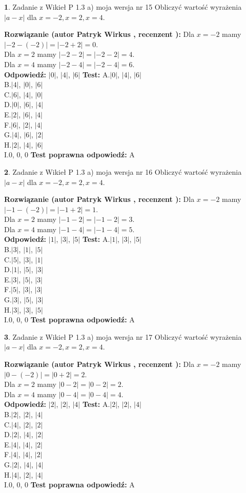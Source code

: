 \documentclass[12pt, a4paper]{article}
\theoremstyle{definition} %
\newtheorem{zad}{}
\newcommand{\zadStart}[1]{\begin{zad}#1\newline}
\newcommand{\zadStop}{\end{zad}}
\newcommand{\rozwStart}[2]{\noindent \textbf{Rozwiązanie (autor #1 , recenzent #2): }\newline}
\newcommand{\rozwStop}{\newline}
\newcommand{\odpStart}{\noindent \textbf{Odpowiedź:}\newline}
\newcommand{\odpStop}{\newline}
\newcommand{\testStart}{\noindent \textbf{Test:}\newline}
\newcommand{\testStop}{\newline}
\newcommand{\kluczStart}{\noindent \textbf{Test poprawna odpowiedź:}\newline}
\newcommand{\kluczStop}{\newline}
\begin{document}
\zadStart{Zadanie z Wikieł P 1.3 a) moja wersja nr 15}
Obliczyć wartość wyrażenia $|a - x|$ dla $x=-2,x=2,x=4$.
\zadStop
\rozwStart{Patryk Wirkus}{}
Dla $x = -2$ mamy $|-2 - (-2)| = |-2 + 2| = 0$.\\
Dla $x = 2$ mamy $|-2 - 2| = |-2 - 2| = 4$.\\
Dla $x = 4$ mamy $|-2 - 4| = |-2 - 4| = 6$.\\
\rozwStop
\odpStart
$|0|$, $|4|$, $|6|$
\odpStop
\testStart
A.$|0|$, $|4|$, $|6|$\\
B.$|4|$, $|0|$, $|6|$\\
C.$|6|$, $|4|$, $|0|$\\
D.$|0|$, $|6|$, $|4|$\\
E.$|2|$, $|6|$, $|4|$\\
F.$|6|$, $|2|$, $|4|$\\
G.$|4|$, $|6|$, $|2|$\\
H.$|2|$, $|4|$, $|6|$\\
I.$0$, $0$, $0$
\testStop
\kluczStart
A
\kluczStop



\zadStart{Zadanie z Wikieł P 1.3 a) moja wersja nr 16}
Obliczyć wartość wyrażenia $|a - x|$ dla $x=-2,x=2,x=4$.
\zadStop
\rozwStart{Patryk Wirkus}{}
Dla $x = -2$ mamy $|-1 - (-2)| = |-1 + 2| = 1$.\\
Dla $x = 2$ mamy $|-1 - 2| = |-1 - 2| = 3$.\\
Dla $x = 4$ mamy $|-1 - 4| = |-1 - 4| = 5$.\\
\rozwStop
\odpStart
$|1|$, $|3|$, $|5|$
\odpStop
\testStart
A.$|1|$, $|3|$, $|5|$\\
B.$|3|$, $|1|$, $|5|$\\
C.$|5|$, $|3|$, $|1|$\\
D.$|1|$, $|5|$, $|3|$\\
E.$|3|$, $|5|$, $|3|$\\
F.$|5|$, $|3|$, $|3|$\\
G.$|3|$, $|5|$, $|3|$\\
H.$|3|$, $|3|$, $|5|$\\
I.$0$, $0$, $0$
\testStop
\kluczStart
A
\kluczStop



\zadStart{Zadanie z Wikieł P 1.3 a) moja wersja nr 17}
Obliczyć wartość wyrażenia $|a - x|$ dla $x=-2,x=2,x=4$.
\zadStop
\rozwStart{Patryk Wirkus}{}
Dla $x = -2$ mamy $|0 - (-2)| = |0 + 2| = 2$.\\
Dla $x = 2$ mamy $|0 - 2| = |0 - 2| = 2$.\\
Dla $x = 4$ mamy $|0 - 4| = |0 - 4| = 4$.\\
\rozwStop
\odpStart
$|2|$, $|2|$, $|4|$
\odpStop
\testStart
A.$|2|$, $|2|$, $|4|$\\
B.$|2|$, $|2|$, $|4|$\\
C.$|4|$, $|2|$, $|2|$\\
D.$|2|$, $|4|$, $|2|$\\
E.$|4|$, $|4|$, $|2|$\\
F.$|4|$, $|4|$, $|2|$\\
G.$|2|$, $|4|$, $|4|$\\
H.$|4|$, $|2|$, $|4|$\\
I.$0$, $0$, $0$
\testStop
\kluczStart
A
\kluczStop
\end{document}
